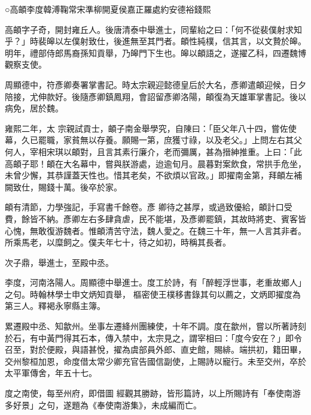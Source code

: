 
\begin{pinyinscope}

 ○高頔李度韓溥鞠常宋準柳開夏侯嘉正羅處約安德裕錢熙



 高頔字子奇，開封雍丘人。後唐清泰中舉進士，同輩紿之曰：「何不從裴僕射求知乎？」時裴皞以左僕射致仕，後進無至其門者。頔性純樸，信其言，以文贄於皞。明年，禮部侍郎馬裔孫知貢舉，乃皞門下生也。皞以頔語之，遂擢乙科，四遷魏博觀察支使。



 周顯德中，符彥卿奏署掌書記。時太宗親迎懿德皇后於大名，彥卿遣頔迎候，日夕陪接，尤伸款好。後隨彥卿鎮鳳翔，會詔留彥卿洛陽，頔復為天雄軍掌書記。後以病免，居於魏。



 雍熙二年，太
 宗親試貢士，頔子南金舉學究，自陳曰：「臣父年八十四，嘗佐使幕，久已罷職，家貧無以存養。願賜一第，庶獲寸祿，以及老父。」上問左右其父何人，宰相宋琪以頔對，且言其素行廉介，老而彌厲，甚為搢紳推重。上曰：「此高頔子耶！頔在大名幕中，嘗與朕游處，迨逾旬月。晨暮對案飲食，常拱手危坐，未曾少懈，其恭謹蓋天性也。惜其老矣，不欲煩以官政。」即擢南金第，拜頔左補闕致仕，賜錢十萬。後卒於家。



 頔有清節，力學強記，手寫書千餘卷。彥
 卿待之甚厚，或過致優給，頔計口受費，餘皆不納。彥卿左右多肆貪虐，民不能堪，及彥卿罷鎮，其故時將吏、賓客皆心愧，無敢復游魏者。惟頔清苦守法，魏人愛之。在魏三十年，無一人言其非者。所乘馬老，以糜飼之。僕夫年七十，待之如初，時稱其長者。



 次子鼎，舉進士，至殿中丞。



 李度，河南洛陽人。周顯德中舉進士。度工於詩，有「醉輕浮世事，老重故鄉人」之句。時翰林學士申文炳知貢舉，
 樞密使王樸移書錄其句以薦之，文炳即擢度為第三人。釋褐永寧縣主簿。



 累遷殿中丞、知歙州。坐事左遷絳州團練使，十年不調。度在歙州，嘗以所著詩刻於石，有中黃門得其石本，傳入禁中，太宗見之，謂宰相曰：「度今安在？」即令召至，對於便殿，與語甚悅，擢為虞部員外郎、直史館，賜緋。端拱初，籍田畢，交州黎桓加恩，命度借太常少卿充官告國信副使，上賜詩以寵行。未至交州，卒於太平軍傳舍，年五十七。



 度之南使，每至州府，即借圖
 經觀其勝跡，皆形篇詩，以上所賜詩有「奉使南游多好景」之句，遂題為《奉使南游集》，未成編而亡。




\end{pinyinscope}
